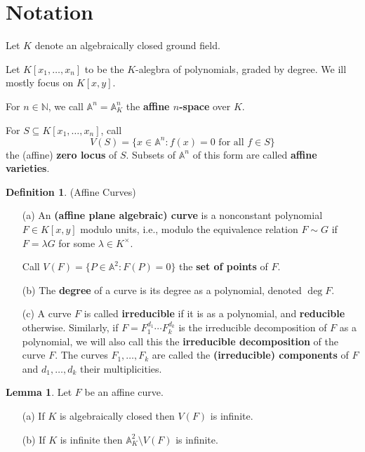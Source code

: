 \documentclass[12pt]{article}
\theoremstyle{definition}
\newtheorem{lem}{Lemma}
\newtheorem{defn}{Definition}
\newcommand{\N}{\mathbb{N}}
\newcommand{\<}{\langle}
\renewcommand{\>}{\rangle}
\newcommand{\A}{\mathbb{A}}
\begin{document}
\thispagestyle{title}

\section*{Notation}

Let $K$ denote an algebraically closed ground field.

Let $K[x_1, \dots, x_n]$ to be the $K$-alegbra of polynomials, graded by degree. We ill mostly focus on $K[x, y]$.

For $n \in \N$, we call $\A^n = \A_K^n$ the \textbf{affine $n$-space} over $K$.

For $S \subseteq K[x_1, \dots, x_n]$, call
\[
    V(S) = \{x \in \A^n : f(x) = 0 \text{ for all } f \in S\}
\]
the (affine) \textbf{zero locus} of $S$. Subsets of $\A^n$ of this form are called \textbf{affine varieties}.




\begin{defn}(Affine Curves)
    \begin{itemize}
        \item[(a)] An \textbf{(affine plane algebraic) curve} is a nonconstant polynomial $F \in K[x, y]$ modulo units, i.e., modulo the equivalence relation $F \sim G$ if $F = \lambda G$ for some $\lambda \in K^\times$. 

        Call $V(F) = \{P \in \A^2 : F(P) = 0\}$ the \textbf{set of points} of $F$.
        
        \item[(b)] The \textbf{degree} of a curve is its degree as a polynomial, denoted $\deg F$.
        
        \item[(c)] A curve $F$ is called \textbf{irreducible} if it is as a polynomial, and \textbf{reducible} otherwise. Similarly, if $F = F_1^{d_1} \cdots F_k^{d_k}$ is the irreducible decomposition of $F$ as a polynomial, we will also call this the \textbf{irreducible decomposition} of the curve $F$. The curves $F_1, \dots, F_k$ are called the \textbf{(irreducible) components} of $F$ and $d_1, \dots, d_k$ their multiplicities.
    \end{itemize}
    
\end{defn}


\begin{lem}
    Let $F$ be an affine curve.
    \begin{itemize}
        \item[(a)] If $K$ is algebraically closed then $V(F)$ is infinite.
        \item[(b)] If $K$ is infinite then $\A_K^2 \setminus V(F)$ is infinite.
    \end{itemize}
\end{lem}
\end{document}
